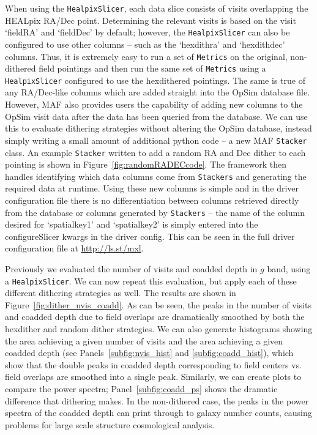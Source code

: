 \documentclass[]{spie}  %
\begin{document}
When using the {\tt HealpixSlicer}, each data slice consists of visits
overlapping the HEALpix RA/Dec point. Determining the relevant visits
is based on the visit `fieldRA' and `fieldDec' by default; however,
the {\tt HealpixSlicer} can also be configured to use other columns -- such
as the `hexdithra' and `hexdithdec' columns. Thus, it is extremely
easy to run a set of {\tt Metrics} on the original, non-dithered field
pointings and then run the same set of {\tt Metrics} using a {\tt HealpixSlicer}
configured to use the hexdithered pointings. The same is true of any
RA/Dec-like columns which are added straight into the OpSim database
file. However, MAF also provides users the capability of adding new
columns to the OpSim visit data after the data has been queried from the database. We can use this to
evaluate dithering strategies without altering the OpSim database,
instead simply writing a small amount of additional python code -- a new
MAF {\tt Stacker} class.  An example {\tt Stacker} written to
add a random RA and Dec dither to each pointing is shown in
Figure~\ref{fig:randomRADECcode}.  The framework then handles
identifying which data columns come from {\tt Stackers} and generating
the required data at runtime. Using these new
columns is simple and in the driver configuration file there is no
differentiation between columns retrieved directly from the database
or columns generated by {\tt Stackers} -- the name of the column
desired for `spatialkey1' and `spatialkey2' is simply entered into the
configureSlicer kwargs in the driver config. This can be seen in the full
driver configuration file at {\url {http://ls.st/mxl}}.

Previously we evaluated the number of visits and coadded depth in $g$
band, using a {\tt HealpixSlicer}. We can now repeat this evaluation, but
apply each of these different dithering strategies as well. The
results are shown in Figure~\ref{fig:dither_nvis_coadd}. As can be
seen, the peaks in the number of visits and coadded depth due to field
overlaps are dramatically smoothed by both the hexdither and random dither
strategies. We can also generate histograms showing the area achieving a
given number of visits and the area achieving a given coadded depth
(see Panels~\ref{subfig:nvis_hist} and \ref{subfig:coadd_hist}), which
show that the double peaks in coadded depth corresponding to field
centers vs. field overlaps are smoothed into a single peak. Similarly, we can
create plots to compare the power spectra; Panel~\ref{subfig:coadd_ps}
shows the dramatic difference that dithering makes. In the
non-dithered case, the peaks in the power spectra of the coadded depth
can print through to galaxy number counts, causing problems for large
scale structure cosmological analysis\cite{Carroll}.
\end{document}
